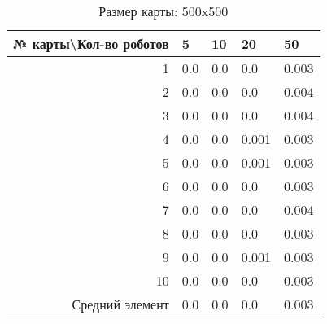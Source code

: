 \begin{table}[H]
\centering
\begin{tabular}{|r|l|l|l|l|}
\hline
№ карты\textbackslash Кол-во роботов & \textbf{5} & \textbf{10} & \textbf{20} & \textbf{50}\\ \hline
1 & 0.0 & 0.0 & 0.0 & 0.003\\ \hline
2 & 0.0 & 0.0 & 0.0 & 0.004\\ \hline
3 & 0.0 & 0.0 & 0.0 & 0.004\\ \hline
4 & 0.0 & 0.0 & 0.001 & 0.003\\ \hline
5 & 0.0 & 0.0 & 0.001 & 0.003\\ \hline
6 & 0.0 & 0.0 & 0.0 & 0.003\\ \hline
7 & 0.0 & 0.0 & 0.0 & 0.004\\ \hline
8 & 0.0 & 0.0 & 0.0 & 0.003\\ \hline
9 & 0.0 & 0.0 & 0.001 & 0.003\\ \hline
10 & 0.0 & 0.0 & 0.0 & 0.003\\ \hline
Средний элемент & 0.0 & 0.0 & 0.0 & 0.003\\ \hline
\end{tabular}
\caption*{Размер карты: 500x500}
\end{table}
